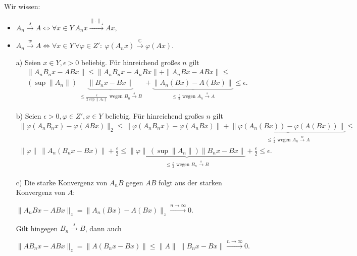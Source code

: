 \begin{solution}
\leavevmode \\
  Wir wissen:
\begin{itemize}
    \item $A_n \xrightarrow{s} A \Leftrightarrow \forall x \in Y~ A_nx \xrightarrow{\mathbb{ \| . \|}_z} Ax,$
    \item $A_n \xrightarrow{w} A \Leftrightarrow \forall x \in Y~ \forall \varphi \in Z':~ \varphi(A_nx) \xrightarrow{\mathbb{C}} \varphi(Ax)$.
\end{itemize}

\begin{itemize}
    \item [a)] Seien $x \in Y, \epsilon > 0$ beliebig. Für hinreichend großes $n$ gilt
    \begin{align*}
        \| A_n B_n x - ABx \| \leq \| A_n B_n x - A_n Bx \| + \| A_n Bx - ABx \| \leq \\ (\sup{\| A_n \|}) \underbrace{\| B_n x - Bx \|}_{\substack{\leq
        \frac{\epsilon}{2 \sup{\| A_n \|}}
        \text{~wegen~} B_n \xrightarrow{s} B}} +
        \underbrace{\| A_n(Bx) - A(Bx) \|}_{\substack{\leq \frac{\epsilon}{2} \text{~wegen~} A_n \xrightarrow{s} A}}
        \leq \epsilon.
    \end{align*}

    \item [b)] Seien $\epsilon > 0, \varphi \in Z', x \in Y$ beliebig. Für hinreichend großes $n$ gilt
    \begin{align*}
        \| \varphi(A_n B_n x) - \varphi(ABx) \|_2
        \leq \| \varphi(A_n B_n x) - \varphi(A_nBx) \|
        +  \underbrace{\| \varphi(A_n (Bx)) - \varphi(A (Bx)) \|}_{\substack{\leq \frac{\epsilon}{2} \text{~wegen~} A_n \xrightarrow{w} A}} \leq \\
        \| \varphi \|~ \| A_n (B_n x - B x) \| + \frac{\epsilon}{2} \leq
        \underbrace{\| \varphi \|~ (\sup{\| A_n \|})
        \| B_n x - Bx \|}_{\substack{\leq \frac{\epsilon}{2} \text{~wegen~} B_n \xrightarrow{s} B}} + \frac{\epsilon}{2} \leq
        \epsilon.
    \end{align*}

    \item [c)]  Die starke Konvergenz von $A_nB$ gegen $AB$ folgt aus der starken Konvergenz von $A$:
    \begin{center} $\| A_n Bx - ABx \|_z = \| A_n(Bx) - A(Bx) \|_z \xrightarrow{n \rightarrow \infty} 0.$ \end{center}
    Gilt hingegen $B_n \xrightarrow{s} B$, dann auch
    \begin{center}
     $\| AB_n x - ABx \|_z = \| A(B_n x - Bx) \| \leq
       \| A \|~ \| B_n x - Bx \| \xrightarrow{n \rightarrow \infty} 0.$
    \end{center}


\end{itemize}
\end{solution}
